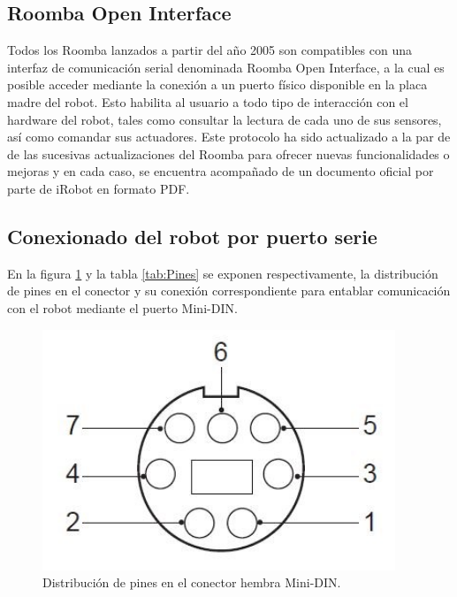 \subsection{Roomba Open Interface}
Todos los Roomba lanzados a partir del año 2005 son compatibles con una interfaz de comunicación serial denominada Roomba Open Interface, a la cual es posible acceder mediante la conexión a un puerto físico disponible en la placa madre del robot. Esto habilita al usuario a todo tipo de interacción con el hardware del robot, tales como consultar la lectura de cada uno de sus sensores, así como comandar sus actuadores. Este protocolo ha sido actualizado a la par de de las sucesivas actualizaciones del Roomba para ofrecer nuevas funcionalidades o mejoras y en cada caso, se encuentra acompañado de un documento oficial por parte de iRobot en formato PDF\protect\footnotemark.



\subsection{Conexionado del robot por puerto serie}

En la figura \ref{fig:roombaPinout} y la tabla \ref{tab:Pines} se exponen respectivamente, la distribución de pines en el conector y su conexión correspondiente para entablar comunicación con el robot mediante el puerto Mini-DIN.

\begin{figure}[ht]
    \centering
    \includegraphics[scale=.4]{./Figures/pinout.png}
    \caption{Distribución de pines en el conector hembra Mini-DIN.}
    \label{fig:roombaPinout}
\end{figure}

